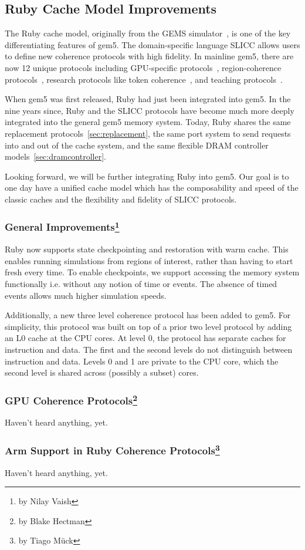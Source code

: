\subsection[Ruby Cache Model Improvements]{Ruby Cache Model Improvements}
\label{sec:ruby}

The Ruby cache model, originally from the GEMS simulator~\cite{}, is one of the key differentiating features of gem5.
The domain-specific language SLICC allows users to define new coherence protocols with high fidelity.
In mainline gem5, there are now 12 unique protocols including GPU-specific protocols~\cite{viper}, region-coherence protocols~\cite{Power2012hsc}, research protocols like token coherence~\cite{token-coherence}, and teaching protocols~\cite{coherence-primer}.

When gem5 was first released, Ruby had just been integrated into gem5.
In the nine years since, Ruby and the SLICC protocols have become much more deeply integrated into the general gem5 memory system.
Today, Ruby shares the same replacement protocols~\ref{sec:replacement}, the same port system to send requests into and out of the cache system, and the same flexible DRAM controller models~\ref{sec:dramcontroller}.

Looking forward, we will be further integrating Ruby into gem5.
Our goal is to one day have a unified cache model which has the composability and speed of the classic caches and the flexibility and fidelity of SLICC protocols.

\subsubsection[General Improvements]{General Improvements\footnote{by Nilay Vaish}}

Ruby now supports state checkpointing and restoration with warm cache.
This enables running simulations from regions of interest, rather than having to start fresh every time.
To enable checkpoints, we support accessing the memory system functionally i.e. without any notion of time or events.
The absence of timed events allows much higher simulation speeds.

Additionally, a new three level coherence protocol has been added to gem5.
For simplicity, this protocol was built on top of a prior two level protocol by adding an L0 cache at the CPU cores.
At level 0, the protocol has separate caches for instruction and data.
The first and the second levels do not distinguish between instruction and data.
Levels 0 and 1 are private to the CPU core, which the second level is shared across (possibly a subset) cores.

\subsubsection[GPU Coherence Protocols]{GPU Coherence Protocols\footnote{by Blake Hectman}}

Haven't heard anything, yet.

\subsubsection[Arm Support and Extensions]{Arm Support in Ruby Coherence Protocols\footnote{by Tiago M{\"u}ck}}

Haven't heard anything, yet.
